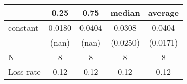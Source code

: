 \begin{tabular}{lcccc}
\hline
          &  0.25  &  0.75  &  median  & average   \\
\midrule
\midrule
constant  & 0.0180 & 0.0404 & 0.0308   & 0.0404    \\
          & (nan)  & (nan)  & (0.0250) & (0.0171)  \\
N         & 8      & 8      & 8        & 8         \\
Loss rate & 0.12   & 0.12   & 0.12     & 0.12      \\
\hline
\end{tabular}